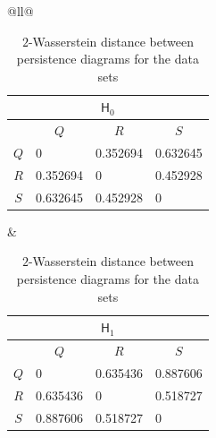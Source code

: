 \documentclass[sn-mathphys-num]{sn-jnl}%
\theoremstyle{thmstyleone}%
\theoremstyle{thmstyletwo}%
\theoremstyle{thmstylethree}%
\begin{document}
\begin{table}[h]
	\centering
	\caption{$2$-Wasserstein distance between persistence diagrams for the data sets}
	\begin{tabular}{@{}ll@{}}
		\begin{tabular}{@{}clll@{}}
			\multicolumn{4}{c}{$\mathsf{H}_0$}                                                \\ \toprule
			& \multicolumn{1}{c}{$Q$} & \multicolumn{1}{c}{$R$} & \multicolumn{1}{c}{$S$} \\ \midrule
			$Q$ & 0                       & 0.352694                & 0.632645                \\
			$R$ & 0.352694                & 0                       & 0.452928                \\
			$S$ & 0.632645                & 0.452928                & 0                       \\ \bottomrule
		\end{tabular}
		&
		\begin{tabular}{@{}clll@{}}
			\multicolumn{4}{c}{$\mathsf{H}_1$}                                                \\ \toprule
			& \multicolumn{1}{c}{$Q$} & \multicolumn{1}{c}{$R$} & \multicolumn{1}{c}{$S$} \\ \midrule
			$Q$ & 0                       & 0.635436                & 0.887606                \\
			$R$ & 0.635436                & 0                       & 0.518727                \\
			$S$ & 0.887606                & 0.518727                & 0                       \\ \bottomrule
		\end{tabular}
	\end{tabular}
	\label{table: Wasserstein distance}
\end{table}
\newpage
\end{document}
